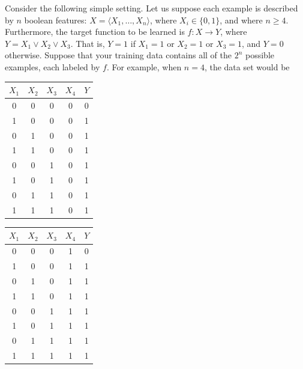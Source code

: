 \documentclass[11pt]{article}
\begin{document}
Consider the following simple setting. Let us suppose each example is described by $n$ boolean features: $X = \langle X_1, \ldots, X_n \rangle$, where $X_i \in \{0, 1\}$, and where $n \geq 4$. Furthermore, the target function to be learned is $f : X \rightarrow Y$, where $Y = X_1 \vee X_2 \vee X_3$. That is, $Y = 1$ if $X_1 = 1$ or $X_2 = 1$ or $X_3 = 1$, and $Y = 0$ otherwise. Suppose that your training data contains all of the $2^n$ possible examples, each labeled by $f$. For example, when $n = 4$, the data set would be
\begin{table}[H]
\centering
\begin{tabular}{cccc|c}
$X_1$ & $X_2$ & $X_3$ & $X_4$ & $Y$\\ \hline
0 & 0 & 0 & 0 & 0\\
1 & 0 & 0 & 0 & 1\\
0 & 1 & 0 & 0 & 1\\
1 & 1 & 0 & 0 & 1\\
0 & 0 & 1 & 0 & 1\\
1 & 0 & 1 & 0 & 1\\
0 & 1 & 1 & 0 & 1\\
1 & 1 & 1 & 0 & 1\\
\end{tabular}
\quad \quad \quad \quad
\begin{tabular}{cccc|c}
$X_1$ & $X_2$ & $X_3$ & $X_4$ & $Y$\\ \hline
0 & 0 & 0 & 1 & 0\\
1 & 0 & 0 & 1 & 1\\
0 & 1 & 0 & 1 & 1\\
1 & 1 & 0 & 1 & 1\\
0 & 0 & 1 & 1 & 1\\
1 & 0 & 1 & 1 & 1\\
0 & 1 & 1 & 1 & 1\\
1 & 1 & 1 & 1 & 1\\
\end{tabular}
\end{table}
\end{document}
